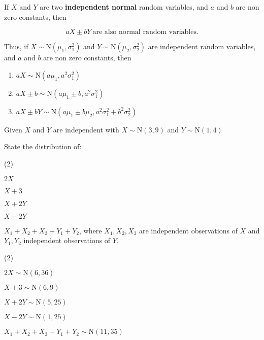 \documentclass[11pt,a4paper]{book}
\begin{document}
\medskip


If $X$ and $Y$ are two \textbf{independent normal} random variables,
and $a$ and $b$ are non zero constants, then

\[
aX\pm bY\:\text{are also normal random variables.}
\]

Thus, if $X\sim\text{N}\left(\mu_{1},\sigma_{1}^{2}\right)$ and $Y\sim\text{N}\left(\mu_{2},\sigma_{2}^{2}\right)$
are independent random variables, and $a$ and $b$ are non zero constants,
then

\begin{enumerate}[label=(\alph*)]

\item $aX\sim\text{N}\left(a\mu_{1},a^{2}\sigma_{1}^{2}\right)$

\item $aX\pm b\sim\text{N}\left(a\mu_{1}\pm b,a^{2}\sigma_{1}^{2}\right)$

\item $aX\pm bY\sim\text{N}\left(a\mu_{1}\pm b\mu_{2},a^{2}\sigma_{1}^{2}+b^{2}\sigma_{2}^{2}\right)$

\end{enumerate}

\begin{example}

Given $X$ and $Y$ are independent with $X\sim\text{N}\left(3,9\right)$
and $Y\sim\text{N}\left(1,4\right)$

State the distribution of:

\begin{tasks}[label=(\alph*),label-width=3.5ex](2)

\task  $2X$

\task  $X+3$

\task  $X+2Y$

\task  $X-2Y$

\task  $X_{1}+X_{2}+X_{3}+Y_{1}+Y_{2}$, where $X_{1},X_{2},X_{3}$
are independent observations of $X$ and $Y_{1},Y_{2}$ independent
observations of $Y$.

\end{tasks}

\Solution

\begin{tasks}[label=(\alph*),label-width=3.5ex](2)

\task  $2X\sim\text{N}\left(6,36\right)$

\task  $X+3\sim\text{N}\left(6,9\right)$

\task  $X+2Y\sim\text{N}\left(5,25\right)$

\task  $X-2Y\sim\text{N}\left(1,25\right)$

\task  $X_{1}+X_{2}+X_{3}+Y_{1}+Y_{2}\sim\text{N}\left(11,35\right)$

\end{tasks}

\end{example}
\end{document}

